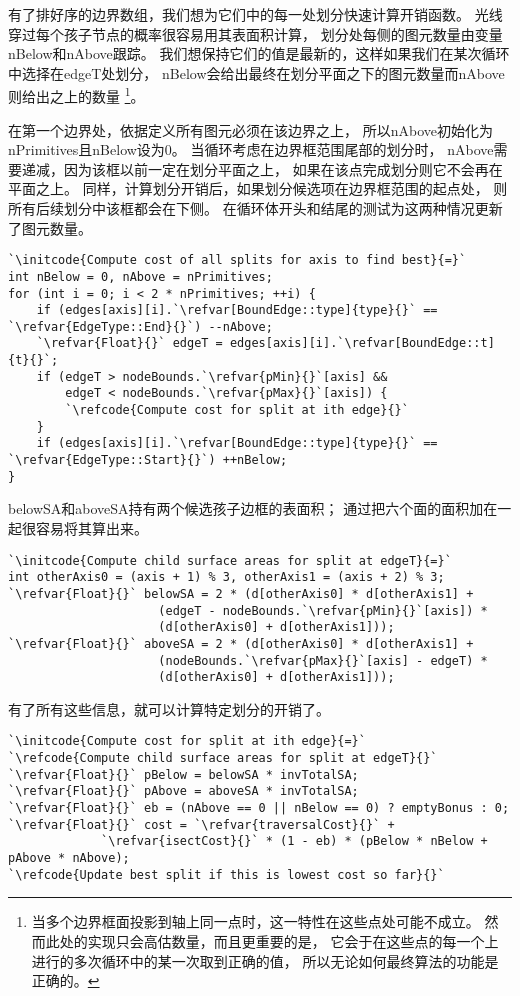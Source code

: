 有了排好序的边界数组，我们想为它们中的每一处划分快速计算开销函数。
光线穿过每个孩子节点的概率很容易用其表面积计算，
划分处每侧的图元数量由变量{\ttfamily nBelow}和{\ttfamily nAbove}跟踪。
我们想保持它们的值是最新的，这样如果我们在某次循环中选择在{\ttfamily edgeT}处划分，
{\ttfamily nBelow}会给出最终在划分平面之下的图元数量而{\ttfamily nAbove}则给出之上的数量
\footnote{当多个边界框面投影到轴上同一点时，这一特性在这些点处可能不成立。
然而此处的实现只会高估数量，而且更重要的是，
它会于在这些点的每一个上进行的多次循环中的某一次取到正确的值，
所以无论如何最终算法的功能是正确的。}。

在第一个边界处，依据定义所有图元必须在该边界之上，
所以{\ttfamily nAbove}初始化为{\ttfamily nPrimitives}且{\ttfamily nBelow}设为0。
当循环考虑在边界框范围尾部的划分时，
{\ttfamily nAbove}需要递减，因为该框以前一定在划分平面之上，
如果在该点完成划分则它不会再在平面之上。
同样，计算划分开销后，如果划分候选项在边界框范围的起点处，
则所有后续划分中该框都会在下侧。
在循环体开头和结尾的测试为这两种情况更新了图元数量。
\begin{lstlisting}
`\initcode{Compute cost of all splits for axis to find best}{=}`
int nBelow = 0, nAbove = nPrimitives;
for (int i = 0; i < 2 * nPrimitives; ++i) {
    if (edges[axis][i].`\refvar[BoundEdge::type]{type}{}` == `\refvar{EdgeType::End}{}`) --nAbove;
    `\refvar{Float}{}` edgeT = edges[axis][i].`\refvar[BoundEdge::t]{t}{}`;
    if (edgeT > nodeBounds.`\refvar{pMin}{}`[axis] &&
        edgeT < nodeBounds.`\refvar{pMax}{}`[axis]) {
        `\refcode{Compute cost for split at ith edge}{}`
    }
    if (edges[axis][i].`\refvar[BoundEdge::type]{type}{}` == `\refvar{EdgeType::Start}{}`) ++nBelow;
}
\end{lstlisting}

{\ttfamily belowSA}和{\ttfamily aboveSA}持有两个候选孩子边框的表面积；
通过把六个面的面积加在一起很容易将其算出来。
\begin{lstlisting}
`\initcode{Compute child surface areas for split at edgeT}{=}`
int otherAxis0 = (axis + 1) % 3, otherAxis1 = (axis + 2) % 3;
`\refvar{Float}{}` belowSA = 2 * (d[otherAxis0] * d[otherAxis1] +
                     (edgeT - nodeBounds.`\refvar{pMin}{}`[axis]) * 
                     (d[otherAxis0] + d[otherAxis1]));
`\refvar{Float}{}` aboveSA = 2 * (d[otherAxis0] * d[otherAxis1] +
                     (nodeBounds.`\refvar{pMax}{}`[axis] - edgeT) * 
                     (d[otherAxis0] + d[otherAxis1]));
\end{lstlisting}

有了所有这些信息，就可以计算特定划分的开销了。
\begin{lstlisting}
`\initcode{Compute cost for split at ith edge}{=}`
`\refcode{Compute child surface areas for split at edgeT}{}`
`\refvar{Float}{}` pBelow = belowSA * invTotalSA; 
`\refvar{Float}{}` pAbove = aboveSA * invTotalSA;
`\refvar{Float}{}` eb = (nAbove == 0 || nBelow == 0) ? emptyBonus : 0;
`\refvar{Float}{}` cost = `\refvar{traversalCost}{}` + 
             `\refvar{isectCost}{}` * (1 - eb) * (pBelow * nBelow + pAbove * nAbove);
`\refcode{Update best split if this is lowest cost so far}{}`
\end{lstlisting}

